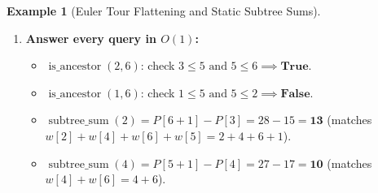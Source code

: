 \documentclass[11pt,a4paper]{article}
\theoremstyle{definition}
\newtheorem{example}{Example}[section]
\begin{document}
\begin{example}[Euler Tour Flattening and Static Subtree Sums]
\begin{enumerate}
\begin{itemize}[itemsep=1pt, topsep=2pt]
        \item $P = [0, 5, 8, 15, 17, 21, 27, 28]$.
    \end{itemize}
    \item \textbf{Answer every query in $O(1)$:}
    \begin{itemize}[itemsep=1pt, topsep=2pt]
        \item $\operatorname{is\_ancestor}(2, 6)$: check $3 \le 5 \text{ and } 5 \le 6 \implies \textbf{True}$.
        \item $\operatorname{is\_ancestor}(1, 6)$: check $1 \le 5 \text{ and } 5 \le 2 \implies \textbf{False}$.
        \item $\operatorname{subtree\_sum}(2) = P[6 + 1] - P[3] = 28 - 15 = \mathbf{13}$ (matches $w[2]+w[4]+w[6]+w[5] = 2+4+6+1$).
        \item $\operatorname{subtree\_sum}(4) = P[5 + 1] - P[4] = 27 - 17 = \mathbf{10}$ (matches $w[4]+w[6] = 4+6$).
    \end{itemize}
\end{enumerate}
\end{example}
\end{document}
